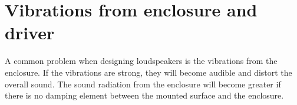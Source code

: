 \section{Vibrations from enclosure and driver}

A common problem when designing loudspeakers is the vibrations from the enclosure. If the vibrations are strong, they will become audible and distort the overall sound. The sound radiation from the enclosure will become greater if there is no damping element between the mounted surface and the enclosure.


